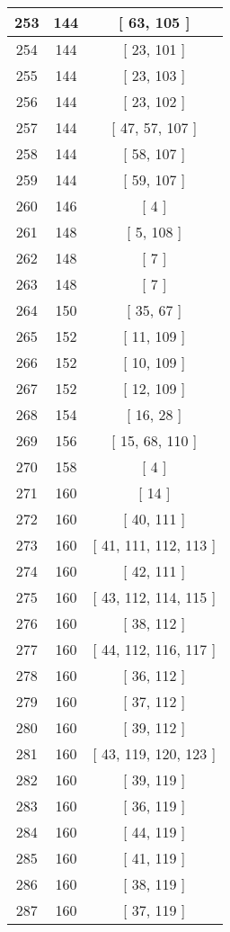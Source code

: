\begin{center}
\begin{longtable}[H]{|| c c c ||}
\hline
253 & 144 & [ 63, 105 ] \\ 
\hline
254 & 144 & [ 23, 101 ] \\ 
\hline
255 & 144 & [ 23, 103 ] \\ 
\hline
256 & 144 & [ 23, 102 ] \\ 
\hline
257 & 144 & [ 47, 57, 107 ] \\ 
\hline
258 & 144 & [ 58, 107 ] \\ 
\hline
259 & 144 & [ 59, 107 ] \\ 
\hline
260 & 146 & [ 4 ] \\ 
\hline
261 & 148 & [ 5, 108 ] \\ 
\hline
262 & 148 & [ 7 ] \\ 
\hline
263 & 148 & [ 7 ] \\ 
\hline
264 & 150 & [ 35, 67 ] \\ 
\hline
265 & 152 & [ 11, 109 ] \\ 
\hline
266 & 152 & [ 10, 109 ] \\ 
\hline
267 & 152 & [ 12, 109 ] \\ 
\hline
268 & 154 & [ 16, 28 ] \\ 
\hline
269 & 156 & [ 15, 68, 110 ] \\ 
\hline
270 & 158 & [ 4 ] \\ 
\hline
271 & 160 & [ 14 ] \\ 
\hline
272 & 160 & [ 40, 111 ] \\ 
\hline
273 & 160 & [ 41, 111, 112, 113 ] \\ 
\hline
274 & 160 & [ 42, 111 ] \\ 
\hline
275 & 160 & [ 43, 112, 114, 115 ] \\ 
\hline
276 & 160 & [ 38, 112 ] \\ 
\hline
277 & 160 & [ 44, 112, 116, 117 ] \\ 
\hline
278 & 160 & [ 36, 112 ] \\ 
\hline
279 & 160 & [ 37, 112 ] \\ 
\hline
280 & 160 & [ 39, 112 ] \\ 
\hline
281 & 160 & [ 43, 119, 120, 123 ] \\ 
\hline
282 & 160 & [ 39, 119 ] \\ 
\hline
283 & 160 & [ 36, 119 ] \\ 
\hline
284 & 160 & [ 44, 119 ] \\ 
\hline
285 & 160 & [ 41, 119 ] \\ 
\hline
286 & 160 & [ 38, 119 ] \\ 
\hline
287 & 160 & [ 37, 119 ] \\ 

\end{longtable}
\end{center}
